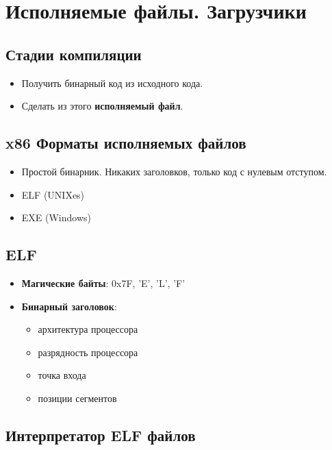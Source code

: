 \section{Исполняемые файлы. Загрузчики}

\subsection{Стадии компиляции}

\begin{itemize}
	\item Получить бинарный код из исходного кода. 
	\item Сделать из этого \textbf{исполняемый файл}.
\end{itemize}

 \subsection{x86 Форматы исполняемых файлов}
 
 \begin{itemize}
 	\item Простой бинарник. Никаких заголовков, только код с нулевым отступом.
 	\item ELF (UNIXes)
 	\item EXE (Windows)
 \end{itemize}

\subsection{ELF}

\begin{itemize}
	\item \textbf{Магические байты}: {0x7F, 'E', 'L', 'F'}
	\item \textbf{Бинарный заголовок}:
		\begin{itemize}
			\item архитектура процессора
			\item разрядность процессора
			\item точка входа
			\item позиции сегментов
		\end{itemize}
\end{itemize}

\subsection{Интерпретатор ELF файлов}

